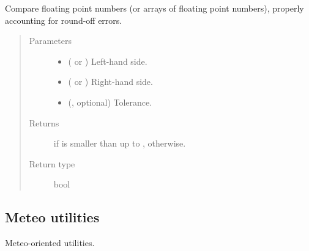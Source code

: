 \documentclass[letterpaper,10pt,english]{sphinxmanual}
\begin{document}
\begin{fulllineitems}
\label{\detokenize{api:tasmania.utils.utils.smaller_than}}
Compare floating point numbers (or arrays of floating point numbers), properly accounting for round-off errors.
\begin{quote}\begin{description}
\item[{Parameters}] \leavevmode\begin{itemize}
\item {} 
 ( or ) \textendash{} Left-hand side.

\item {} 
 ( or ) \textendash{} Right-hand side.

\item {} 
 (, optional) \textendash{} Tolerance.

\end{itemize}

\item[{Returns}] \leavevmode
{} if  is smaller than  up to ,  otherwise.

\item[{Return type}] \leavevmode
bool

\end{description}\end{quote}

\end{fulllineitems}



\subsection{Meteo utilities}
\label{\detokenize{api:meteo-utilities}}\label{\detokenize{api:module-tasmania.utils.utils_meteo}}
Meteo-oriented utilities.
\end{document}
